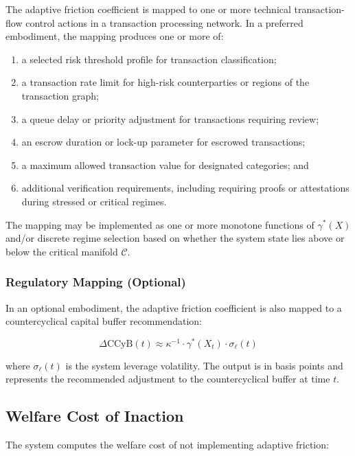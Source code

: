 \documentclass[12pt,a4paper]{article}
\begin{document}
The adaptive friction coefficient is mapped to one or more technical 
transaction-flow control actions in a transaction processing network. In a 
preferred embodiment, the mapping produces one or more of:
\begin{enumerate}[label=(\alph*)]
\item a selected risk threshold profile for transaction classification;
\item a transaction rate limit for high-risk counterparties or regions of 
the transaction graph;
\item a queue delay or priority adjustment for transactions requiring 
review;
\item an escrow duration or lock-up parameter for escrowed transactions;
\item a maximum allowed transaction value for designated categories; and
\item additional verification requirements, including requiring proofs or 
attestations during stressed or critical regimes.
\end{enumerate}

The mapping may be implemented as one or more monotone functions of 
$\gamma^*(X)$ and/or discrete regime selection based on whether the system 
state lies above or below the critical manifold $\mathcal{C}$.

\subsubsection{Regulatory Mapping (Optional)}

In an optional embodiment, the adaptive friction coefficient is also mapped 
to a countercyclical capital buffer recommendation:

\begin{equation}
\Delta\text{CCyB}(t) \approx \kappa^{-1} \cdot \gamma^*(X_t) \cdot 
\sigma_\ell(t)
\end{equation}

where $\sigma_\ell(t)$ is the system leverage volatility. The output is 
in basis points and represents the recommended adjustment to the 
countercyclical buffer at time $t$.

\subsection{Welfare Cost of Inaction}

The system computes the welfare cost of not implementing adaptive friction:
\end{document}
